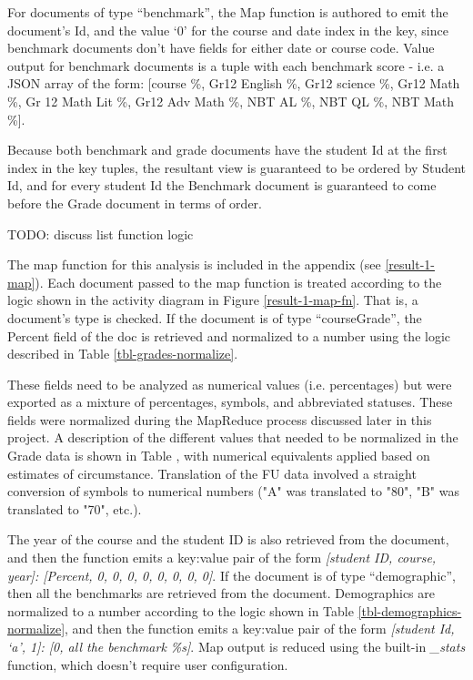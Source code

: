 For documents of type ``benchmark'', the Map function is authored to emit the document's Id, and the value `0' for the course and date index in the key, since benchmark documents don't have fields for either date or course code. Value output for benchmark documents is a tuple with each benchmark score - i.e. a JSON array of the form: [course \%, Gr12 English \%, Gr12 science \%, Gr12 Math \%, Gr 12 Math Lit \%, Gr12 Adv Math \%, NBT AL \%, NBT QL \%, NBT Math \%].

Because both benchmark and grade documents have the student Id at the first index in the key tuples, the resultant view is guaranteed to be ordered by Student Id, and for every student Id the Benchmark document is guaranteed to come before the Grade document in terms of order.

TODO: discuss list function logic

The map function for this analysis is included in the appendix (see \ref{result-1-map}). Each document passed to the map function is treated according to the logic shown in the activity diagram in Figure \ref{result-1-map-fn}. That is, a document's type is checked. If the document is of type ``courseGrade'', the Percent field of the doc is retrieved and normalized to a number using the logic described in Table \ref{tbl-grades-normalize}.

These fields need to be analyzed as numerical values (i.e. percentages) but were exported as a mixture of percentages, symbols, and abbreviated statuses. These fields were normalized during the MapReduce process discussed later in this project. A description of the different values that needed to be normalized in the Grade data is shown in Table , with numerical equivalents applied based on estimates of circumstance. Translation of the FU data involved a straight conversion of symbols to numerical numbers ("A" was translated to "80", "B" was translated to "70", etc.).



The year of the course and the student ID is also retrieved from the document, and then the function emits a key:value pair of the form \textit{[student ID, course, year]: [Percent, 0, 0, 0, 0, 0, 0, 0, 0]}. If the document is of type ``demographic'', then all the benchmarks are retrieved from the document. Demographics are normalized to a number according to the logic shown in Table  \ref{tbl-demographics-normalize}, and then the function emits a key:value pair of the form \textit{[student Id, `a', 1]: [0, all the benchmark \%s]}. Map output is reduced using the built-in \textit{\_stats} function, which doesn't require user configuration.

